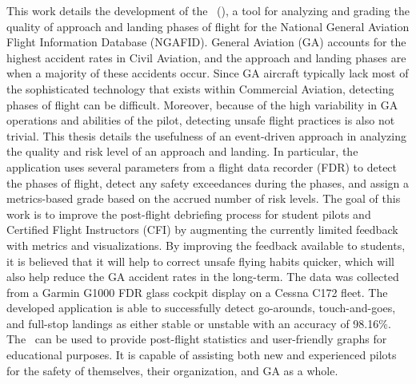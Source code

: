 
	This work details the development of the \toolname\ (\toolnameshort), a tool for analyzing and grading the quality of approach and landing phases of flight for the National General Aviation Flight Information Database (NGAFID).  General Aviation (GA) accounts for the highest accident rates in Civil Aviation, and the approach and landing phases are when a majority of these accidents occur.  Since GA aircraft typically lack most of the sophisticated technology that exists within Commercial Aviation, detecting phases of flight can be difficult.  Moreover, because of the high variability in GA operations and abilities of the pilot, detecting unsafe flight practices is also not trivial.  This thesis details the usefulness of an event-driven approach in analyzing the quality and risk level of an approach and landing.  In particular, the application uses several parameters from a flight data recorder (FDR) to detect the phases of flight, detect any safety exceedances during the phases, and assign a metrics-based grade based on the accrued number of risk levels.  The goal of this work is to improve the post-flight debriefing process for student pilots and Certified Flight Instructors (CFI) by augmenting the currently limited feedback with metrics and visualizations.  By improving the feedback available to students, it is believed that it will help to correct unsafe flying habits quicker, which will also help reduce the GA accident rates in the long-term.  The data was collected from a Garmin G1000 FDR glass cockpit display on a Cessna C172 fleet.  The developed application is able to successfully detect go-arounds, touch-and-goes, and full-stop landings as either stable or unstable with an accuracy of 98.16\%.  The \toolnameshort\ can be used to provide post-flight statistics and user-friendly graphs for educational purposes.  It is capable of assisting both new and experienced pilots for the safety of themselves, their organization, and GA as a whole.